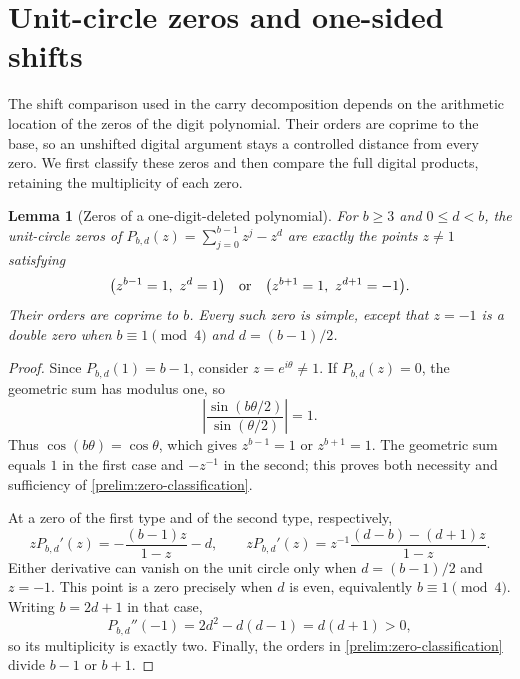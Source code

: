 \documentclass[11pt,a4paper]{article}
\theoremstyle{paperplain}
\newtheorem{lemma}[theorem]{Lemma}
\numberwithin{equation}{section}
\begin{document}
\section{Unit-circle zeros and one-sided shifts}\label{app:shifts}

The shift comparison used in the carry decomposition depends on the
arithmetic location of the zeros of the digit polynomial. Their orders
are coprime to the base, so an unshifted digital argument stays a controlled
distance from every zero. We first classify these zeros and then compare
the full digital products, retaining the multiplicity of each zero.

\begin{lemma}[Zeros of a one-digit-deleted polynomial]\label{prelim:zeros}
For $b\geqslant3$ and $0\leqslant d<b$, the unit-circle zeros of
$P_{b,d}(z)=\sum_{j=0}^{b-1}z^j-z^d$ are exactly the points $z\ne1$
satisfying
\begin{equation}\label{prelim:zero-classification}
 \bigl(z^{b-1}=1,\ z^d=1\bigr)
 \quad\hbox{or}\quad
 \bigl(z^{b+1}=1,\ z^{d+1}=-1\bigr).
\end{equation}
Their orders are coprime to $b$. Every such zero is simple, except that
$z=-1$ is a double zero when $b\equiv1\pmod4$ and $d=(b-1)/2$.
\end{lemma}
\begin{proof}
Since $P_{b,d}(1)=b-1$, consider $z=e^{i\theta}\ne1$.
If $P_{b,d}(z)=0$, the geometric sum has modulus one, so
\[
 \left|\frac{\sin(b\theta/2)}{\sin(\theta/2)}\right|=1.
\]
Thus $\cos(b\theta)=\cos\theta$, which gives $z^{b-1}=1$ or
$z^{b+1}=1$. The geometric sum equals $1$ in the first case and
$-z^{-1}$ in the second; this proves both necessity and sufficiency
of \eqref{prelim:zero-classification}.

At a zero of the first type and of the second type, respectively,
\[
 zP_{b,d}'(z)=-\frac{(b-1)z}{1-z}-d,\qquad
 zP_{b,d}'(z)=z^{-1}\frac{(d-b)-(d+1)z}{1-z}.
\]
Either derivative can vanish on the unit circle only when
$d=(b-1)/2$ and $z=-1$. This point is a zero precisely when $d$ is
even, equivalently $b\equiv1\pmod4$. Writing $b=2d+1$ in that case,
\[
 P_{b,d}''(-1)=2d^2-d(d-1)=d(d+1)>0,
\]
so its multiplicity is exactly two. Finally, the orders in
\eqref{prelim:zero-classification} divide $b-1$ or $b+1$.
\end{proof}
\end{document}
